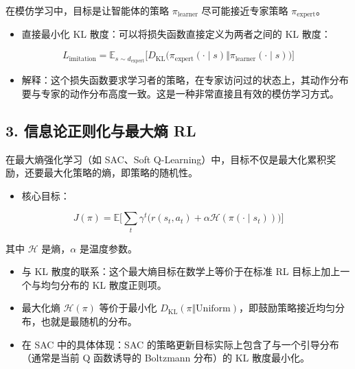 在模仿学习中，目标是让智能体的策略 \(\pi_{\mathrm{learner}}\) 尽可能接近专家策略 \(\pi_{\mathrm{expert}}\)。

\begin{itemize}
\tightlist
\item
{}
  直接最小化 KL 散度：可以将损失函数直接定义为两者之间的 KL 散度：
\end{itemize}

\[
L_{\mathrm{imitation}}
=
\mathbb{E}_{s\sim d_{\mathrm{expert}}}
\bigl[
D_{\mathrm{KL}}\bigl(
\pi_{\mathrm{expert}}(\cdot\mid s)
\Vert
\pi_{\mathrm{learner}}(\cdot\mid s)
\bigr)
\bigr]
\]

\begin{itemize}
\tightlist
\item
  解释：这个损失函数要求学习者的策略，在专家访问过的状态上，其动作分布要与专家的动作分布高度一致。这是一种非常直接且有效的模仿学习方式。
\end{itemize}

\hypertarget{ux4fe1ux606fux8bbaux6b63ux5219ux5316ux4e0eux6700ux5927ux71b5-rl}{%
\subsection{3. 信息论正则化与最大熵 RL}\label{ux4fe1ux606fux8bbaux6b63ux5219ux5316ux4e0eux6700ux5927ux71b5-rl}}

在最大熵强化学习（如 SAC、Soft Q-Learning）中，目标不仅是最大化累积奖励，还要最大化策略的熵，即策略的随机性。

\begin{itemize}
\tightlist
\item
{}
  核心目标：
\end{itemize}

\[
J(\pi)
=
\mathbb{E}
\bigl[
\sum_t \gamma^{t}
\bigl(
r(s_t,a_t)+\alpha\mathcal{H}(\pi(\cdot\mid s_t))
\bigr)
\bigr]
\]

其中 \(\mathcal{H}\) 是熵，\(\alpha\) 是温度参数。

\begin{itemize}
\tightlist
\item
  与 KL 散度的联系：这个最大熵目标在数学上等价于在标准 RL 目标上加上一个与均匀分布的 KL 散度正则项。
\item
  最大化熵 \(\mathcal{H}(\pi)\) 等价于最小化 \(D_{\mathrm{KL}}(\pi\Vert\mathrm{Uniform})\)，即鼓励策略接近均匀分布，也就是最随机的分布。
\item
  在 SAC 中的具体体现：SAC 的策略更新目标实际上包含了与一个引导分布（通常是当前 Q 函数诱导的 Boltzmann 分布）的 KL 散度最小化。
\end{itemize}

